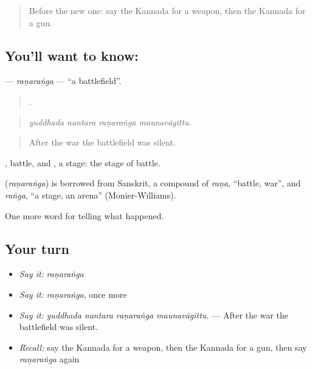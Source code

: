 \label{lesson:KA-C344-ranaranga}



\begin{quote}
Before the new one: say the Kannada for a weapon, then the Kannada for a gun.
\end{quote}

\subsection*{You'll want to know: }
\textbf{} — \emph{raṇaraṅga} — \textquotedblleft{}a battlefield\textquotedblright{}.

\begin{quote}
   .
\end{quote}

\begin{quote}
\emph{yuddhada nantara raṇaraṅga maunavāgittu.}
\end{quote}

\begin{quote}
After the war the battlefield was silent.
\end{quote}

, battle, and , a stage: the stage of battle.

\begin{cousinweb}
\textbf{} (\emph{raṇaraṅga}) is borrowed from Sanskrit, a compound of \emph{raṇa}, \textquotedblleft{}battle, war\textquotedblright{}, and \emph{raṅga}, \textquotedblleft{}a stage, an arena\textquotedblright{} (Monier-Williams).
\end{cousinweb}

\begin{grammarlens}[title={What you've built}]
One more word for telling what happened.
\end{grammarlens}

\subsection*{Your turn}
\begin{itemize}
\raggedright
  \item \emph{Say it:} \emph{raṇaraṅga}
  \item \emph{Say it:} \emph{raṇaraṅga}, once more
  \item \emph{Say it:} \emph{yuddhada nantara raṇaraṅga maunavāgittu.} — After the war the battlefield was silent.
  \item \emph{Recall:} say the Kannada for a weapon, then the Kannada for a gun, then say \emph{raṇaraṅga} again
\end{itemize}

